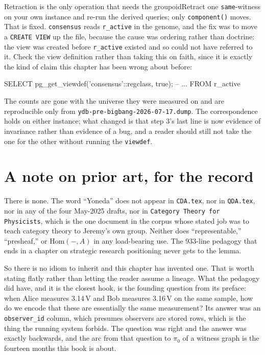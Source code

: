 \begin{Correspondence}{Retraction is the only operation that needs the groupoid}{Retract one \texttt{same}-witness on your own instance and re-run the derived queries; only \texttt{component()} moves.}
That is fixed. \texttt{consensus} reads \texttt{r\_active} in the genome, and the fix was to move a \texttt{CREATE VIEW} up the file, because the cause was ordering rather than doctrine: the view was created before \texttt{r\_active} existed and so could not have referred to it. Check the view definition rather than taking this on faith, since it is exactly the kind of claim this chapter has been wrong about before:

\begin{Check}
SELECT pg_get_viewdef('consensus'::regclass, true);   -- ... FROM r_active
\end{Check}

The counts are gone with the universe they were measured on and are reproducible only from \texttt{ydb-pre-bigbang-2026-07-17.dump}. The correspondence holds on either instance; what changed is that step 3's last line is now evidence of invariance rather than evidence of a bug, and a reader should still not take the one for the other without running the \texttt{viewdef}.
\end{Correspondence}

\section{A note on prior art, for the record}

There is none. The word ``Yoneda'' does not appear in \texttt{CDA.tex}, nor in \texttt{QDA.tex}, nor in any of the four May-2025 drafts, nor in \texttt{Category Theory for Physicists}, which is the one document in the corpus whose stated job was to teach category theory to Jeremy's own group. Neither does ``representable,'' ``presheaf,'' or $\mathrm{Hom}(-,A)$ in any load-bearing use. The 933-line pedagogy that ends in a chapter on strategic research positioning never gets to the lemma.

So there is no idiom to inherit and this chapter has invented one. That is worth stating flatly rather than letting the reader assume a lineage. What the pedagogy did have, and it is the closest hook, is the founding question from its preface: when Alice measures 3.14\,V and Bob measures 3.16\,V on the same sample, how do we encode that these are essentially the same measurement? Its answer was an \texttt{observer\_id} column, which presumes observers are stored rows, which is the thing the running system forbids. The question was right and the answer was exactly backwards, and the arc from that question to $\pi_0$ of a witness graph is the fourteen months this book is about.

